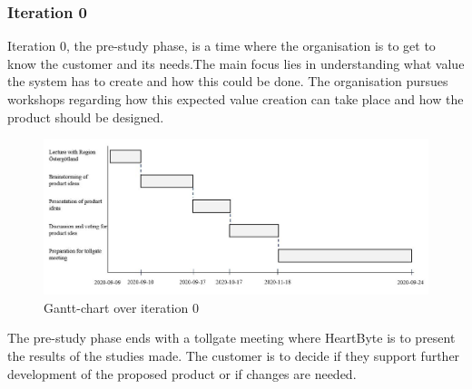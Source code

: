 \subsubsection{Iteration 0}
Iteration 0, the pre-study phase, is a time where the organisation is to get to know the customer and its needs.The main focus lies in understanding what value the system has to create and how this could be done. The organisation pursues workshops regarding how this expected value creation can take place and how the product should be designed.

\begin{figure}[H]
\centering
\includegraphics[width=\linewidth]{Pictures/iteration_0.JPG}
\caption{Gantt-chart over iteration 0}
\label{fig:iteration_0}
\end{figure}

The pre-study phase ends with a tollgate meeting where HeartByte is to present the results of the studies made. The customer is to decide if they support further development of the proposed product or if changes are needed.


